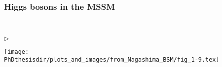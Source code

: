 \begin{frame}
\frametitle{Higgs bosons in the MSSM}

~
\begin{minipage}[c]{.475\textwidth}
\footnotesize\hspace{-1.25em}$\triangleright$\hspace{.75em}\scriptsize{}
\end{minipage}
\hfill
\begin{minipage}[c]{.5\textwidth}
\begin{center}
\texttt{[image: \\PhDthesisdir/plots\_and\_images/from\_Nagashima\_BSM/fig\_1-9.tex]}
\end{center}
\end{minipage}
\end{frame}

%
